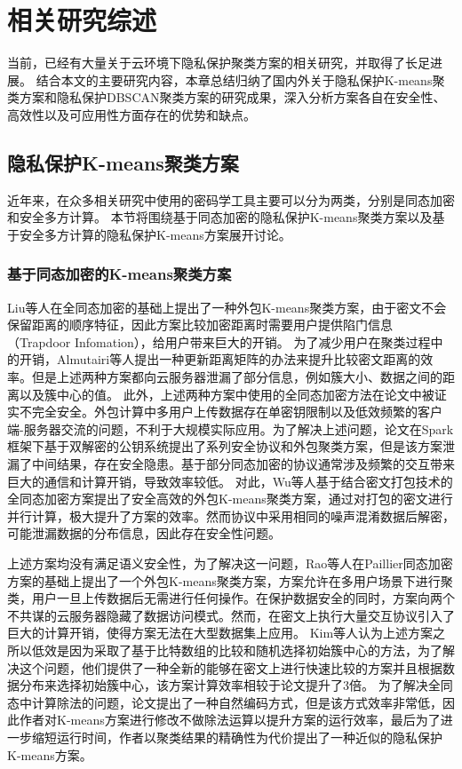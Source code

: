 \chapter{相关研究综述}
当前，已经有大量关于云环境下隐私保护聚类方案的相关研究，并取得了长足进展。
结合本文的主要研究内容，本章总结归纳了国内外关于隐私保护K-means聚类方案和隐私保护DBSCAN聚类方案的研究成果，深入分析方案各自在安全性、高效性以及可应用性方面存在的优势和缺点。

\section{隐私保护K-means聚类方案}
近年来，在众多相关研究中使用的密码学工具主要可以分为两类，分别是同态加密和安全多方计算。
本节将围绕基于同态加密的隐私保护K-means聚类方案以及基于安全多方计算的隐私保护K-means方案展开讨论。

\subsection{基于同态加密的K-means聚类方案}
Liu等人\cite{liu2014privacy}在全同态加密的基础上提出了一种外包K-means聚类方案，由于密文不会保留距离的顺序特征，因此方案比较加密距离时需要用户提供陷门信息（Trapdoor Infomation），给用户带来巨大的开销。 
为了减少用户在聚类过程中的开销，Almutairi等人\cite{almutairi2017k}提出一种更新距离矩阵的办法来提升比较密文距离的效率。但是上述两种方案都向云服务器泄漏了部分信息，例如簇大小、数据之间的距离以及簇中心的值。
此外，上述两种方案中使用的全同态加密方法在论文\cite{wang2015notes}中被证实不完全安全。外包计算中多用户上传数据存在单密钥限制以及低效频繁的客户端-服务器交流的问题，不利于大规模实际应用。为了解决上述问题，论文\cite{rong2017privacy}在Spark框架下基于双解密的公钥系统提出了系列安全协议和外包聚类方案，但是该方案泄漏了中间结果，存在安全隐患。基于部分同态加密的协议通常涉及频繁的交互带来巨大的通信和计算开销，导致效率较低。
对此，Wu等人\cite{wu2020secure}基于结合密文打包技术的全同态加密方案提出了安全高效的外包K-means聚类方案，通过对打包的密文进行并行计算，极大提升了方案的效率。然而协议中采用相同的噪声混淆数据后解密，可能泄漏数据的分布信息，因此存在安全性问题。

上述方案均没有满足语义安全性，为了解决这一问题，Rao等人\cite{rao2015privacy}在Paillier同态加密方案的基础上提出了一个外包K-means聚类方案，方案允许在多用户场景下进行聚类，用户一旦上传数据后无需进行任何操作。在保护数据安全的同时，方案向两个不共谋的云服务器隐藏了数据访问模式。然而，在密文上执行大量交互协议引入了巨大的计算开销，使得方案无法在大型数据集上应用。
Kim等人\cite{kim2018privacy}认为上述方案\cite{rao2015privacy}之所以低效是因为采取了基于比特数组的比较和随机选择初始簇中心的方法，为了解决这个问题，他们提供了一种全新的能够在密文上进行快速比较的方案并且根据数据分布来选择初始簇中心，该方案计算效率相较于论文\cite{rao2015privacy}提升了3倍。
为了解决全同态中计算除法的问题，论文\cite{jaschke2019unsupervised}提出了一种自然编码方式，但是该方式效率非常低，因此作者对K-means方案进行修改不做除法运算以提升方案的运行效率，最后为了进一步缩短运行时间，作者以聚类结果的精确性为代价提出了一种近似的隐私保护K-means方案。

